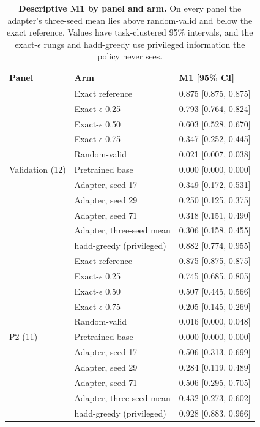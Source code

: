 \begin{table}[t]
\caption{\textbf{Descriptive M1 by panel and arm.} On every panel the adapter's three-seed mean lies above random-valid and below the exact reference. Values have task-clustered 95\% intervals, and the exact-$\epsilon$ rungs and hadd-greedy use privileged information the policy never sees.}
\label{tab:appendix-panel-arms}
\centering\footnotesize
\setlength{\tabcolsep}{5pt}
\begin{tabular}{@{}lll@{}}
\toprule[0.4mm]
\rowcolor{mygray}\textbf{Panel} & \textbf{Arm} & \textbf{M1 [95\% CI]} \\
\midrule
\multirow{11}{*}{Validation (12)} & Exact reference & 0.875 [0.875, 0.875] \\
 & Exact-$\epsilon$ 0.25 & 0.793 [0.764, 0.824] \\
 & Exact-$\epsilon$ 0.50 & 0.603 [0.528, 0.670] \\
 & Exact-$\epsilon$ 0.75 & 0.347 [0.252, 0.445] \\
 & Random-valid & 0.021 [0.007, 0.038] \\
 & Pretrained base & 0.000 [0.000, 0.000] \\
 & Adapter, seed 17 & 0.349 [0.172, 0.531] \\
 & Adapter, seed 29 & 0.250 [0.125, 0.375] \\
 & Adapter, seed 71 & 0.318 [0.151, 0.490] \\
 & Adapter, three-seed mean & 0.306 [0.158, 0.455] \\
\midrule
 & hadd-greedy (privileged) & 0.882 [0.774, 0.955] \\
\midrule
\multirow{11}{*}{P2 (11)} & Exact reference & 0.875 [0.875, 0.875] \\
 & Exact-$\epsilon$ 0.25 & 0.745 [0.685, 0.805] \\
 & Exact-$\epsilon$ 0.50 & 0.507 [0.445, 0.566] \\
 & Exact-$\epsilon$ 0.75 & 0.205 [0.145, 0.269] \\
 & Random-valid & 0.016 [0.000, 0.048] \\
 & Pretrained base & 0.000 [0.000, 0.000] \\
 & Adapter, seed 17 & 0.506 [0.313, 0.699] \\
 & Adapter, seed 29 & 0.284 [0.119, 0.489] \\
 & Adapter, seed 71 & 0.506 [0.295, 0.705] \\
 & Adapter, three-seed mean & 0.432 [0.273, 0.602] \\
\midrule
 & hadd-greedy (privileged) & 0.928 [0.883, 0.966] \\

\end{tabular}
\end{table}
